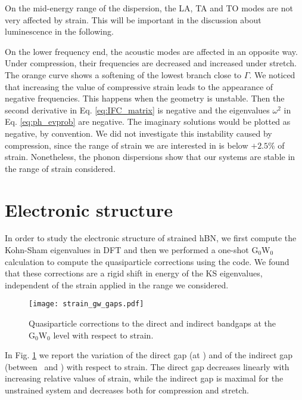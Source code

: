 On the mid-energy range of the dispersion, the LA, TA and TO modes are not very affected by strain. This will be important in the discussion about luminescence in the following.

On the lower frequency end, the acoustic modes are affected in an opposite way. Under compression, their frequencies are decreased and increased under stretch. The orange curve shows a softening of the lowest branch close to $\Gamma$. We noticed that increasing the value of compressive strain leads to the appearance of negative frequencies. This happens when the geometry is unstable. Then the second derivative in Eq. \eqref{eq:IFC_matrix} is negative and the eigenvalues $\omega^2$ in Eq. \eqref{eq:ph_evprob} are negative. The imaginary solutions would be plotted as negative, by convention. We did not investigate this instability caused by compression, since the range of strain we are interested in is below $+2.5\%$ of strain. Nonetheless, the phonon dispersions show that our systems are stable in the range of strain considered.

%
\section{Electronic structure}
In order to study the electronic structure of strained hBN, we first compute the Kohn-Sham eigenvalues in \acrshort{DFT} and then we performed a one-shot G$_0$W$_0$ calculation to compute the quasiparticle corrections using the \yambo code.\cite{Sangalli_2019} We found that these corrections are a rigid shift in energy of the KS eigenvalues, independent of the strain applied in the range we considered. 
\begin{figure}[tbp]
	\vspace{0.5cm}
	\setcapindent{2em}
	\centering
	\texttt{[image: strain\_gw\_gaps.pdf]}
	\caption{Quasiparticle corrections to the direct and indirect bandgaps at the G$_0$W$_0$ level with respect to strain.}
	\label{fig:strain_gw_gaps}
\end{figure}
In Fig. \ref{fig:strain_gw_gaps} we report the variation of the direct gap (at \MM) and of the indirect gap (between \KK~and \MM) with respect to strain. The direct gap decreases linearly with increasing relative values of strain, while the indirect gap is maximal for the unstrained system and decreases both for compression and stretch.

